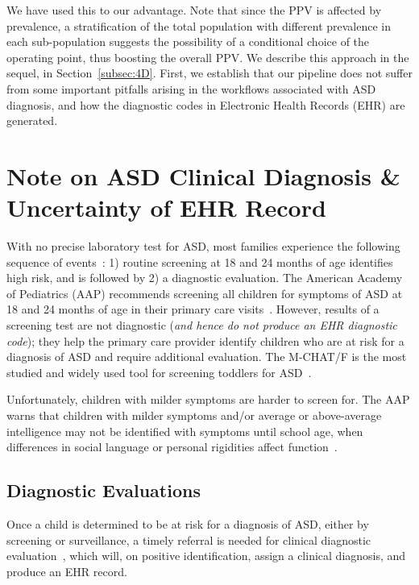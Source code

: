 \documentclass[3p,super,numbers,sort&compress,preprint,10pt]{elsarticle}
\begin{document}
We have used this to our advantage. Note that since the PPV is affected by prevalence,  a stratification of the total population with different prevalence in each sub-population suggests the possibility of a conditional choice of the operating point, thus boosting the overall PPV. We describe this approach in the sequel, in Section~\ref{subsec:4D}. First, we establish that our pipeline does not suffer from some important pitfalls arising in the workflows associated with ASD diagnosis, and how the diagnostic codes in Electronic Health Records (EHR) are generated.
%
\section{Note on ASD Clinical Diagnosis \& Uncertainty of EHR Record}\label{sec:diag}
With no precise laboratory  test for ASD, most families experience the following sequence of events~\cite{gordon2016whittling,penner2018practice,hyman2020identification}: 1) routine screening at 18 and 24 months of age  identifies high risk, and   is followed by 2) a diagnostic evaluation. The American Academy of Pediatrics (AAP)  recommends screening all
children for symptoms of ASD
 at 18 and
24 months of age in their primary
care visits~\cite{johnson2007identification,zwaigenbaum2015early}.  However, results of a screening test are not
diagnostic (\textit{and hence do not produce an EHR diagnostic code}); they help the primary care
provider identify children who are at
risk for a diagnosis of ASD and
require additional evaluation. The M-CHAT/F is the
most studied and widely used tool
for screening toddlers for ASD~\cite{robins2014validation,hyman2020identification}.

Unfortunately, children with milder symptoms are harder to screen for.
The AAP warns that children with milder symptoms
and/or average or above-average
intelligence  may not be identified
with symptoms until  school age,
when differences in social language
or personal rigidities affect function~\cite{hyman2020identification}.
%
\subsection{Diagnostic Evaluations}\label{subsec:diageval}

Once a child is determined to be at
risk for a diagnosis of ASD, either by
screening or surveillance, a timely
referral is needed for clinical diagnostic
evaluation~\cite{penner2018practice}, which 
will, on positive identification, assign a clinical diagnosis, and 
produce an EHR record.
\end{document}
